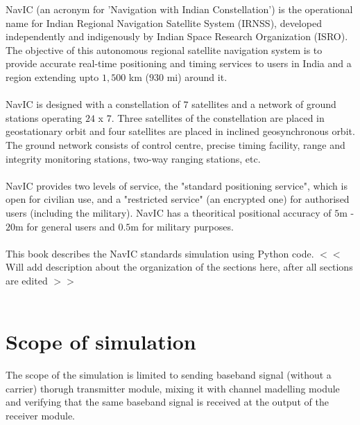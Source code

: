 




%


NavIC (an acronym for 'Navigation with Indian Constellation') is the operational name for Indian Regional Navigation Satellite System (IRNSS), developed independently and indigenously by Indian Space Research Organization (ISRO). The objective of this autonomous regional satellite navigation system is to provide accurate real-time positioning and timing services to users in India and a region extending upto $1,500$ km ($930$ mi) around it. 
\\
\\
NavIC is designed with a constellation of $7$ satellites and a network of ground stations operating $24$ x $7$. Three satellites of the constellation
are placed in geostationary orbit and four satellites are placed in inclined geosynchronous orbit. The ground network consists of control centre, precise timing facility, range and integrity monitoring stations, two-way ranging stations, etc.
\\
\\
NavIC provides two levels of service, the "standard positioning service", which is open for civilian use, and a "restricted service" (an encrypted one) for authorised users (including the military). NavIC has a theoritical positional accuracy of $5$m - $20$m for general users and $0.5$m for military purposes.
\\
\\
This book describes the NavIC standards simulation using Python code. $<<$ Will add description about the organization of the sections here, after all sections are edited $>>$
\\
\\
\section{Scope of simulation}	
The scope of the simulation is limited to sending baseband signal (without a carrier) thorugh transmitter module, mixing it with channel madelling module and verifying that the same baseband signal is received at the output of the receiver module.

%
